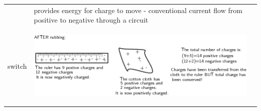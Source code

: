 \begin{center}
\begin{xtabular*}{\mytablewidth}[t]{|p{10\mystarwidth}|p{10\mystarwidth}|p{10\mystarwidth}|}
\begin{center}
    \vspace{.1in}
    
    \end{center}



    \addtocounter{footnote}{-0}
    
                   &
    
    
        provides energy for charge to move - conventional current flow from positive to negative through a circuit%
     \tabularnewline{}
    
    
        switch &
    
    
        
                    
    \setcounter{subfigure}{0}

\label{m38771*id62966}
    \begin{center}
    \label{m38771*id62966!!!underscore!!!media}\label{m38771*id62966!!!underscore!!!printimage}\includegraphics{col11305.imgs/m38771_PG10C9_003.png} %
        
      \vspace{2pt}
    \vspace{.1in}
    
    \end{center}



    \addtocounter{footnote}{-0}
    

\end{xtabular*}
\end{center}
